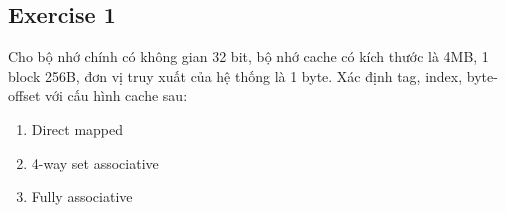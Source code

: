 \subsection{Exercise 1}
Cho bộ nhớ chính có không gian 32 bit, bộ nhớ cache có kích thước là 4MB, 1 block 256B, đơn vị truy xuất của hệ thống là 1 byte.
Xác định tag, index, byte-offset với cấu hình cache sau:
\begin{enumerate}[label=(\alph*), itemsep=0pt]
  \item Direct mapped
  \item 4-way set associative
  \item Fully associative
\end{enumerate}


